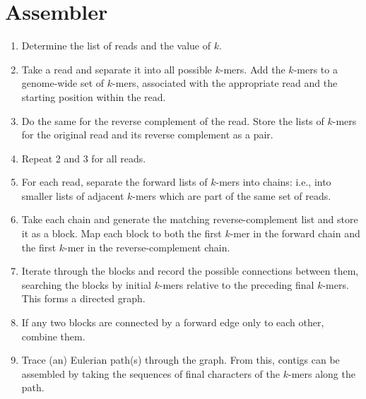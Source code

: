 \documentclass[10pt,letterpaper]{article}
\begin{document}
\section*{Assembler}
\begin{enumerate}
 \item Determine the list of reads and the value of $k$.
 \item Take a read and separate it into all possible $k$-mers. Add the $k$-mers to a genome-wide set of $k$-mers, associated with the appropriate read and the starting position within the read.
 \item Do the same for the reverse complement of the read. Store the lists of $k$-mers for the original read and its reverse complement as a pair.
 \item Repeat 2 and 3 for all reads.
 \item For each read, separate the forward lists of $k$-mers into chains: i.e., into smaller lists of adjacent $k$-mers which are part of the same set of reads.
 \item Take each chain and generate the matching reverse-complement list and store it as a block. Map each block to both the first $k$-mer in the forward chain and the first $k$-mer in the reverse-complement chain.
 \item Iterate through the blocks and record the possible connections between them, searching the blocks by initial $k$-mers relative to the preceding final $k$-mers. This forms a directed graph.
 \item If any two blocks are connected by a forward edge only to each other, combine them.
 \item Trace (an) Eulerian path(s) through the graph. From this, contigs can be assembled by taking the sequences of final characters of the $k$-mers along the path.
\end{enumerate}
\end{document}
